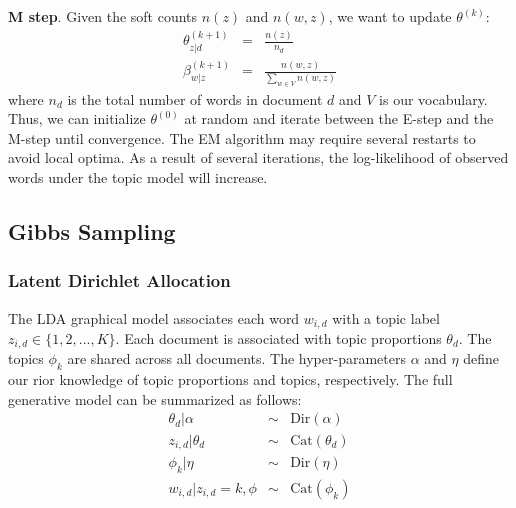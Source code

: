 \textbf{M step}. Given the soft counts $n(z)$ and $n(w,z)$, we want to update $\theta^{(k)}$:
\begin{eqnarray}
    \theta_{z|d}^{(k+1)} &=& \frac{n(z)}{n_d} \\
    \beta_{w|z}^{(k+1)} &=& \frac{n(w,z)}{\sum_{w \in V} n(w,z)}
\end{eqnarray}
where $n_d$ is the total number of words in document $d$ and $V$ is our vocabulary. Thus, we can initialize $\theta^{(0)}$ at random and iterate between the E-step and the M-step until convergence. The EM algorithm may require several restarts to avoid local optima. As a result of several iterations, the log-likelihood of observed words under the topic model will increase.    


\subsection{Gibbs Sampling}


\subsubsection{Latent Dirichlet Allocation}

The LDA graphical model associates each word $w_{i,d}$ with a topic label $z_{i,d} \in \{1,2,...,K\}$. Each document is associated with topic proportions $\theta_d$. The topics $\phi_k$ are shared across all documents. The hyper-parameters $\alpha$ and $\eta$ define our rior knowledge of topic proportions and topics, respectively. The full generative model can be summarized as follows:
\begin{eqnarray}
    \theta_d | \alpha &\sim& \mathrm{Dir}(\alpha)\\
    z_{i,d} | \theta_d &\sim& \mathrm{Cat}(\theta_d)\\
    \phi_k | \eta &\sim& \mathrm{Dir}(\eta)\\
    w_{i,d}|z_{i,d}=k,\phi &\sim& \mathrm{Cat}(\phi_k)
\end{eqnarray}

